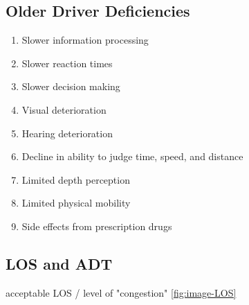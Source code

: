 \documentclass{article}
\begin{document}
  \subsection{Older Driver Deficiencies}
  \begin{enumerate}
    \item Slower information processing
    \item Slower reaction times
    \item Slower decision making
    \item Visual deterioration
    \item Hearing deterioration
    \item Decline in ability to judge time, speed, and distance
    \item Limited depth perception
    \item Limited physical mobility
    \item Side effects from prescription drugs
  \end{enumerate}

  \subsection{LOS and ADT}
  acceptable LOS / level of "congestion" \ref*{fig:image-LOS} \\
\end{document}
